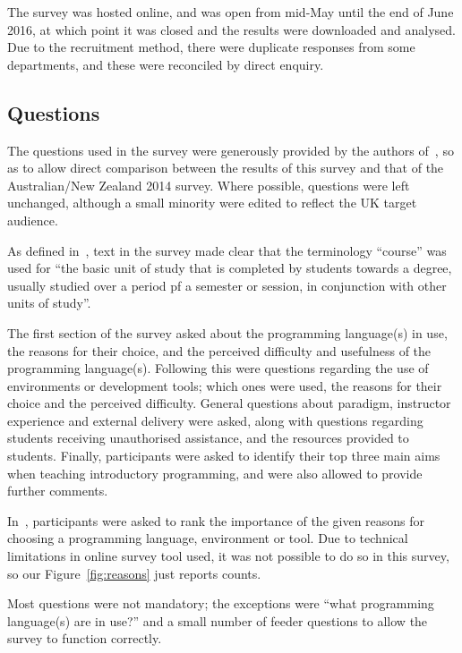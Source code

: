 \documentclass{sig-alternate}
\begin{document}
The survey was hosted online, and was open from mid-May until the end
of June 2016, at which point it was closed and the results were
downloaded and analysed. Due to the recruitment method, there were
duplicate responses from some departments, and these were reconciled
by direct enquiry.

\subsection{Questions}

The questions used in the survey were generously provided by the
authors of~\cite{mason+cooper:2014}, so as to allow direct comparison
between the results of this survey and that of the Australian/New
Zealand 2014 survey. Where possible, questions were left unchanged,
although a small minority were edited to reflect the UK target
audience. 

As defined in~\cite{mason+cooper:2014}, text in the survey made clear
that the terminology ``course'' was used for ``the basic unit of study
that is completed by students towards a degree, usually studied over a
period pf a semester or session, in conjunction with other units of
study''.

The first section of the survey asked about the programming
language(s) in use, the reasons for their choice, and the perceived
difficulty and usefulness of the programming language(s). Following
this were questions regarding the use of environments or development
tools; which ones were used, the reasons for their choice and the
perceived difficulty. General questions about paradigm, instructor
experience and external delivery were asked, along with questions
regarding students receiving unauthorised assistance, and the
resources provided to students. Finally, participants were asked to
identify their top three main aims when teaching introductory
programming, and were also allowed to provide further comments.

In~\cite{mason+cooper:2014}, participants were asked to rank the
importance of the given reasons for choosing a programming language,
environment or tool. Due to technical limitations in online survey
tool used, it was not possible to do so in this survey, so our
Figure~\ref{fig:reasons} just reports counts.

Most questions were not mandatory; the exceptions were ``what
programming language(s) are in use?'' and a small number of feeder
questions to allow the survey to function correctly.
\end{document}
